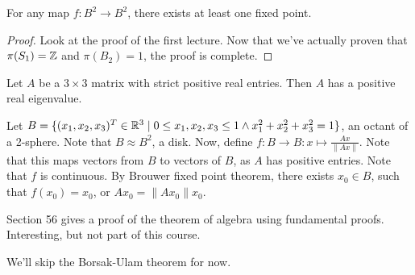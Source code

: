 \begin{theorem}
    For any map $f: B^2 \to B^2$, there exists at least one fixed point.
\end{theorem}
\begin{proof}
    Look at the proof of the first lecture. Now that we've actually proven that $\pi(S_1) = \mathbb{Z}$ and $\pi(B_2) = 1$, the proof is complete.
\end{proof}

\begin{eg}
    Let $A$ be a $3\times 3$ matrix with strict positive real entries.
    Then $A$ has a positive real eigenvalue.
\end{eg}
\begin{explanation}
    Let $B = \{(x_1, x_2, x_3)^{T} \in \mathbb{R}^3  \mid 0 \le  x_1, x_2, x_3 \le  1 \land x_1^2 + x_2^2 + x_3^2 = 1\} $, an octant of a 2-sphere.
    Note that $B \approx B^2$, a disk.
    Now, define $f: B \to B: x \mapsto  \frac{Ax}{\|Ax\|}$.
    Note that this maps vectors from $B$ to vectors of $B$, as $A$ has positive entries.
    Note that $f$ is continuous.
    By Brouwer fixed point theorem, there exists $x_0\in B$, such that $f(x_{0}) = x_0$, or 
    $Ax_0 = \|Ax_0\| x_0$.
\end{explanation}

\begin{remark}
    Section 56 gives a proof of the theorem of algebra using fundamental proofs.
    Interesting, but not part of this course.
\end{remark}
\begin{remark}
    We'll skip the Borsak-Ulam theorem for now.
\end{remark}

\setcounter{section}{57}
\setcounter{chapter}{9}
